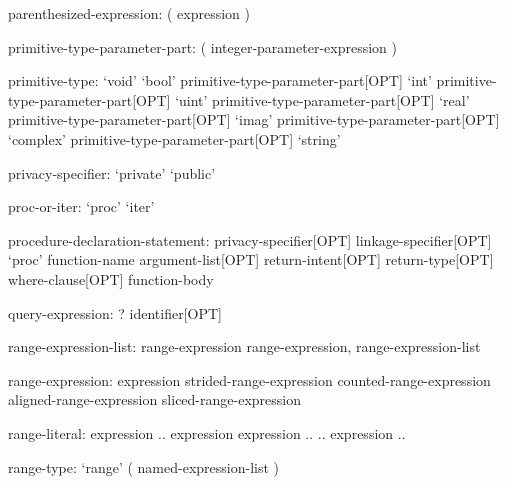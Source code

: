\begin{syntax}
parenthesized-expression:
  ( expression )
\end{syntax}

\begin{syntax}
primitive-type-parameter-part:
  ( integer-parameter-expression )
\end{syntax}

\begin{syntax}
primitive-type:
  `void'
  `bool' primitive-type-parameter-part[OPT]
  `int' primitive-type-parameter-part[OPT]
  `uint' primitive-type-parameter-part[OPT]
  `real' primitive-type-parameter-part[OPT]
  `imag' primitive-type-parameter-part[OPT]
  `complex' primitive-type-parameter-part[OPT]
  `string'
\end{syntax}

\begin{syntax}
privacy-specifier:
  `private'
  `public'
\end{syntax}

\begin{syntax}
proc-or-iter:
  `proc'
  `iter'
\end{syntax}

\begin{syntax}
procedure-declaration-statement:
  privacy-specifier[OPT] linkage-specifier[OPT] `proc' function-name argument-list[OPT] return-intent[OPT] return-type[OPT] where-clause[OPT]
    function-body
\end{syntax}

\begin{syntax}
query-expression:
  ? identifier[OPT]
\end{syntax}

\begin{syntax}
range-expression-list:
  range-expression
  range-expression, range-expression-list
\end{syntax}

\begin{syntax}
range-expression:
  expression
  strided-range-expression
  counted-range-expression
  aligned-range-expression
  sliced-range-expression
\end{syntax}

\begin{syntax}
range-literal:
  expression .. expression
  expression ..
  .. expression
  ..
\end{syntax}

\begin{syntax}
range-type:
  `range' ( named-expression-list )
\end{syntax}


